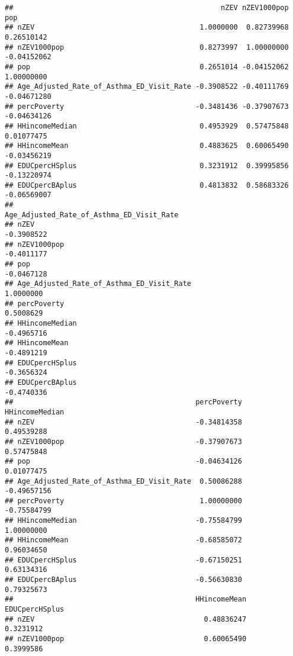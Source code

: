 \documentclass[
]{article}
\begin{document}
\begin{verbatim}
##                                                 nZEV nZEV1000pop         pop
## nZEV                                       1.0000000  0.82739968  0.26510142
## nZEV1000pop                                0.8273997  1.00000000 -0.04152062
## pop                                        0.2651014 -0.04152062  1.00000000
## Age_Adjusted_Rate_of_Asthma_ED_Visit_Rate -0.3908522 -0.40111769 -0.04671280
## percPoverty                               -0.3481436 -0.37907673 -0.04634126
## HHincomeMedian                             0.4953929  0.57475848  0.01077475
## HHincomeMean                               0.4883625  0.60065490 -0.03456219
## EDUCpercHSplus                             0.3231912  0.39995856 -0.13220974
## EDUCpercBAplus                             0.4813832  0.58683326 -0.06569007
##                                           Age_Adjusted_Rate_of_Asthma_ED_Visit_Rate
## nZEV                                                                     -0.3908522
## nZEV1000pop                                                              -0.4011177
## pop                                                                      -0.0467128
## Age_Adjusted_Rate_of_Asthma_ED_Visit_Rate                                 1.0000000
## percPoverty                                                               0.5008629
## HHincomeMedian                                                           -0.4965716
## HHincomeMean                                                             -0.4891219
## EDUCpercHSplus                                                           -0.3656324
## EDUCpercBAplus                                                           -0.4740336
##                                           percPoverty HHincomeMedian
## nZEV                                      -0.34814358     0.49539288
## nZEV1000pop                               -0.37907673     0.57475848
## pop                                       -0.04634126     0.01077475
## Age_Adjusted_Rate_of_Asthma_ED_Visit_Rate  0.50086288    -0.49657156
## percPoverty                                1.00000000    -0.75584799
## HHincomeMedian                            -0.75584799     1.00000000
## HHincomeMean                              -0.68585072     0.96034650
## EDUCpercHSplus                            -0.67150251     0.63134316
## EDUCpercBAplus                            -0.56630830     0.79325673
##                                           HHincomeMean EDUCpercHSplus
## nZEV                                        0.48836247      0.3231912
## nZEV1000pop                                 0.60065490      0.3999586

\end{verbatim}
\end{document}
